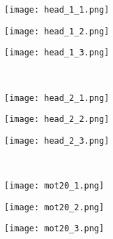 \documentclass[10pt,twocolumn,letterpaper]{article}
\begin{document}
\begin{figure*}
\centering
\begin{subfigure}{.32\textwidth}
  \centering
  \texttt{[image: head\_1\_1.png]}
  \label{fig:head1}
\end{subfigure}\hspace{.005\textwidth}
\begin{subfigure}{.32\textwidth}
  \centering
  \texttt{[image: head\_1\_2.png]}
  \label{fig:head2}
\end{subfigure}
\hspace{.000\textwidth}
\begin{subfigure}{.32\textwidth}
  \centering
  \texttt{[image: head\_1\_3.png]}
  \label{fig:head3}
\end{subfigure}
\\
\begin{subfigure}{.32\textwidth}
  \centering
  \texttt{[image: head\_2\_1.png]}
  \label{fig:head4}
\end{subfigure}\hspace{.005\textwidth}
\begin{subfigure}{.32\textwidth}
  \centering
  \texttt{[image: head\_2\_2.png]}
  \label{fig:head5}
\end{subfigure}
\hspace{.000\textwidth}
\begin{subfigure}{.32\textwidth}
  \centering
  \texttt{[image: head\_2\_3.png]}
  \label{fig:head6}
\end{subfigure}
\\
\begin{subfigure}{.24\textwidth}
  \centering
  \texttt{[image: mot20\_1.png]}
  \label{fig:head7}
\end{subfigure}\hspace{.005\textwidth}
\begin{subfigure}{.24\textwidth}
  \centering
  \texttt{[image: mot20\_2.png]}
  \label{fig:head8}
\end{subfigure}\hspace{.005\textwidth}
\begin{subfigure}{.24\textwidth}
  \centering
  \texttt{[image: mot20\_3.png]}
  \label{fig:head9}
\end{subfigure}\hspace{.005\textwidth}

\end{figure*}
\end{document}
